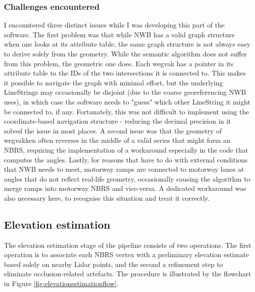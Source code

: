 \subsubsection{Challenges encountered}

I encountered three distinct issues while I was developing this part of the software. The first problem was that while NWB has a valid graph structure when one looks at its attribute table, the same graph structure is not always easy to derive solely from the geometry. While the semantic algorithm does not suffer from this problem, the geometric one does. Each wegvak has a pointer in its attribute table to the IDs of the two intersections it is connected to. This makes it possible to navigate the graph with minimal effort, but the underlying LineStrings may occasionally be disjoint (due to the coarse georeferencing NWB uses), in which case the software needs to "guess" which other LineString it might be connected to, if any. Fortunately, this was not difficult to implement using the coordinate-based navigation structure - reducing the decimal precision in it solved the issue in most places. A second issue was that the geometry of wegvakken often reverses in the middle of a valid series that might form an NBRS, requiring the implementation of a workaround especially in the code that computes the angles. Lastly, for reasons that have to do with external conditions that NWB needs to meet, motorway ramps are connected to motorway lanes at angles that do not reflect real-life geometry, occasionally causing the algorithm to merge ramps into motorway NBRS and vice-versa. A dedicated workaround was also necessary here, to recognise this situation and treat it correctly.

\subsection{Elevation estimation}
\label{sub:m_elevationestimation}

The elevation estimation stage of the pipeline consists of two operations. The first operation is to associate each NBRS vertex with a preliminary elevation estimate based solely on nearby Lidar points, and the second a refinement step to eliminate occlusion-related artefacts. The procedure is illustrated by the flowchart in Figure \ref{fig:elevationestimationflow}.


